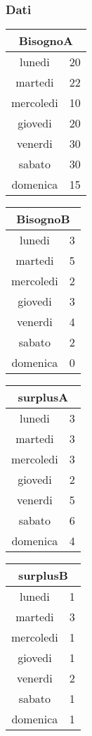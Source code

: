 \subsubsection{Dati}
\begin{tabular}{| c | c |}
    \hline
    \multicolumn{2}{|c|}{BisognoA}\\
    \hline \hline
    lunedi & 20 \\
    martedi & 22 \\
    mercoledi & 10 \\
    giovedi & 20 \\
    venerdi & 30 \\
    sabato & 30 \\
    domenica & 15 \\
    \hline
\end{tabular}
\begin{tabular}{| c | c |}
    \hline
    \multicolumn{2}{|c|}{BisognoB}\\
    \hline \hline
    lunedi & 3 \\
    martedi & 5 \\
    mercoledi & 2 \\
    giovedi & 3 \\
    venerdi & 4 \\
    sabato & 2 \\
    domenica & 0 \\
    \hline
\end{tabular}
\begin{tabular}{| c | c |}
    \hline
    \multicolumn{2}{|c|}{surplusA}\\
    \hline \hline
    lunedi & 3 \\
    martedi & 3 \\
    mercoledi & 3 \\
    giovedi & 2 \\
    venerdi & 5 \\
    sabato & 6 \\
    domenica & 4 \\
    \hline
\end{tabular}
\begin{tabular}{| c | c |}
    \hline
    \multicolumn{2}{|c|}{surplusB}\\
    \hline \hline
    lunedi & 1 \\
    martedi & 3 \\
    mercoledi & 1 \\
    giovedi & 1 \\
    venerdi & 2 \\
    sabato & 1 \\
    domenica & 1 \\
    \hline
\end{tabular}
